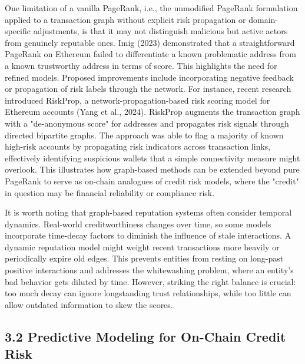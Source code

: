 \documentclass[12pt]{article}
\begin{document}
One limitation of a vanilla PageRank, i.e., the unmodified PageRank formulation applied to a transaction graph without explicit risk propagation or domain-specific adjustments, is that it may not distinguish malicious but active actors from genuinely reputable ones. Imig (2023) demonstrated that a straightforward PageRank on Ethereum failed to differentiate a known problematic address from a known trustworthy address in terms of score. This highlights the need for refined models. Proposed improvements include incorporating negative feedback or propagation of risk labels through the network. For instance, recent research introduced RiskProp, a network-propagation-based risk scoring model for Ethereum accounts (Yang et al., 2024). RiskProp augments the transaction graph with a "de-anonymous score" for addresses and propagates risk signals through directed bipartite graphs. The approach was able to flag a majority of known high-risk accounts by propagating risk indicators across transaction links, effectively identifying suspicious wallets that a simple connectivity measure might overlook. This illustrates how graph-based methods can be extended beyond pure PageRank to serve as on-chain analogues of credit risk models, where the "credit" in question may be financial reliability or compliance risk.


It is worth noting that graph-based reputation systems often consider temporal dynamics. Real-world creditworthiness changes over time, so some models incorporate time-decay factors to diminish the influence of stale interactions. A dynamic reputation model might weight recent transactions more heavily or periodically expire old edges. This prevents entities from resting on long-past positive interactions and addresses the whitewashing problem, where an entity's bad behavior gets diluted by time. However, striking the right balance is crucial: too much decay can ignore longstanding trust relationships, while too little can allow outdated information to skew the scores.


\subsection*{3.2 Predictive Modeling for On-Chain Credit Risk}
\label{sec:predictive-modeling-for-on-chain-credit-risk}
\end{document}

